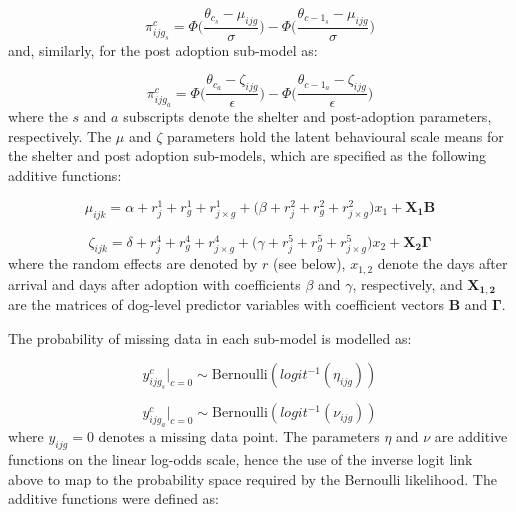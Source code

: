 \documentclass[12pt]{article}
\begin{document}
\begin{equation}
  \pi_{ijg_{s}}^c = \Phi \Big( \frac{\theta_{c_{s}} - \mu_{ijg}}{\sigma} \Big) - \Phi \Big( \frac{\theta_{c-1_{s}} - \mu_{ijg}}{\sigma} \Big)
  \label{eq_ordprob_shelter}
\end{equation}
%
and, similarly, for the post adoption sub-model as:

\begin{equation}
  \pi_{ijg_{a}}^c = \Phi \Big( \frac{\theta_{c_{a}} - \zeta_{ijg}}{\epsilon} \Big) - \Phi \Big( \frac{\theta_{c-1_{a}} - \zeta_{ijg}}{\epsilon} \Big)
  \label{eq_ordprob_adoption}
\end{equation}
%
where the $s$ and $a$ subscripts denote the shelter and post-adoption parameters, respectively. The $\mu$ and $\zeta$ parameters hold the latent behavioural scale means for the shelter and post adoption sub-models, which are specified as the following additive functions:

\begin{equation}
  \mu_{ijk} = \alpha + r_{j}^{1} + r_{g}^{1} + r_{j \times g}^{1} +
              \big(\beta +  r_{j}^{2} + r_{g}^{2} + r_{j \times g}^{2}\big) x_{1} + \mathbf{X_{1}} \mathbf{B}
\end{equation}

\begin{equation}
  \zeta_{ijk} = \delta + r_{j}^{4} + r_{g}^{4} + r_{j \times g}^{4} +
              \big(\gamma +  r_{j}^{5} + r_{g}^{5} + r_{j \times g}^{5}\big) x_{2} + \mathbf{X_{2}} \mathbf{\Gamma}
\end{equation}
%
where the random effects are denoted by $r$ (see below), $x_{1,2}$ denote the days after arrival and days after adoption with coefficients $\beta$ and $\gamma$, respectively, and $\mathbf{X_{1,2}}$ are the matrices of dog-level predictor variables with coefficient vectors $\mathbf{B}$ and $\mathbf{\Gamma}$.

The probability of missing data in each sub-model is modelled as:

\begin{equation}
  y_{ijg_{s}}^{c} \big|_{c=0} \sim \text{Bernoulli}( logit^{-1}(\eta_{ijg}))
  \label{eq_missing_shelter}
\end{equation}

\begin{equation}
  y_{ijg_{a}}^{c} \big|_{c=0} \sim \text{Bernoulli}( logit^{-1}(\nu_{ijg}))
  \label{eq_missing_adoption}
\end{equation}
%
where $y_{ijg} = 0$ denotes a missing data point. The parameters $\eta$ and $\nu$ are additive functions on the linear log-odds scale, hence the use of the inverse logit link above to map to the probability space required by the Bernoulli likelihood. The additive functions were defined as:
\end{document}
